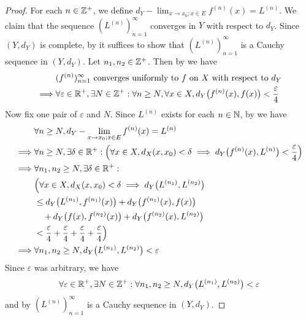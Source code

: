 \begin{proof}
  For each \(n \in \mathbb{Z}^+\), we define \(d_Y - \lim_{x \to x_0 ; x \in E} f^{(n)}(x) = L^{(n)}\).
  We claim that the sequence \((L^{(n)})_{n = 1}^\infty\) converges in \(Y\) with respect to \(d_Y\).
  Since \((Y, d_Y)\) is complete, by  it suffices to show that \((L^{(n)})_{n = 1}^\infty\) is a Cauchy sequence in \((Y, d_Y)\).
  Let \(n_1, n_2 \in \mathbb{Z}^+\).
  Then by  we have
  \begin{align*}
             & (f^{(n)})_{n = 1}^\infty \text{ converges uniformly to } f \text{ on } X \text{ with respect to } d_Y                                        \\
    \implies & \forall \varepsilon \in \mathbb{R}^+, \exists N \in \mathbb{Z}^+ : \forall n \geq N, \forall x \in X, d_Y\big(f^{(n)}(x), f(x)\big) < \dfrac{\varepsilon}{4}
  \end{align*}
  Now fix one pair of \(\varepsilon\) and \(N\).
  Since \(L^{(n)}\) exists for each \(n \in \mathbb{N}\), by  we have
  \begin{align*}
             & \forall n \geq N, d_Y - \lim_{x \to x_0 ; x \in E} f^{(n)}(x) = L^{(n)}                                                                                        \\
    \implies & \forall n \geq N, \exists \delta \in \mathbb{R}^+ : \Big(\forall x \in X, d_X(x, x_0) < \delta \implies d_Y\big(f^{(n)}(x), L^{(n)}\big) < \dfrac{\varepsilon}{4}\Big) \\
    \implies & \forall n_1, n_2 \geq N, \exists \delta \in \mathbb{R}^+ :                                                                                                             \\
             & \Big(\forall x \in X, d_X(x, x_0) < \delta \implies d_Y\big(L^{(n_1)}, L^{(n_2)}\big)                                                                          \\
             & \leq d_Y\big(L^{(n_1)}, f^{(n_1)}(x)\big) + d_Y\big(f^{(n_1)}(x), f(x)\big)                                                                                    \\
             & \quad + d_Y\big(f(x), f^{(n_2)}(x)\big) + d_Y\big(f^{(n_2)}(x), L^{(n_2)}\big)                                                                                 \\
             & < \dfrac{\varepsilon}{4} + \dfrac{\varepsilon}{4} + \dfrac{\varepsilon}{4} + \dfrac{\varepsilon}{4}\Big)                                                       \\
    \implies & \forall n_1, n_2 \geq N, d_Y\big(L^{(n_1)}, L^{(n_2)}\big) < \varepsilon
  \end{align*}
  Since \(\varepsilon\) was arbitrary, we have
  \[
    \forall \varepsilon \in \mathbb{R}^+, \exists N \in \mathbb{Z}^+ : \forall n_1, n_2 \geq N, d_Y\big(L^{(n_1)}, L^{(n_2)}\big) < \varepsilon
  \]
  and by  \((L^{(n)})_{n = 1}^\infty\) is a Cauchy sequence in \((Y, d_Y)\).


\end{proof}
